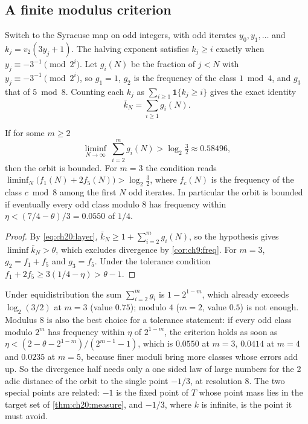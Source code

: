 \subsection{A finite modulus criterion}

Switch to the Syracuse map on odd integers, with odd iterates $y_0,y_1,\dots$ and $k_j=v_2(3y_j+1)$. The halving exponent satisfies $k_j\ge i$ exactly when $y_j\equiv-3^{-1}\pmod{2^i}$. Let $g_i(N)$ be the fraction of $j<N$ with $y_j\equiv-3^{-1}\pmod{2^i}$, so $g_1=1$, $g_2$ is the frequency of the class $1\bmod4$, and $g_3$ that of $5\bmod8$. Counting each $k_j$ as $\sum_{i\ge1}\mathbf 1\{k_j\ge i\}$ gives the exact identity
\begin{equation}\label{eq:ch20:layer}
\bar k_N=\sum_{i\ge1}g_i(N).
\end{equation}

\begin{proposition}\label{prop:ch20:mod8}
If for some $m\ge2$
\[
\liminf_{N\to\infty}\ \sum_{i=2}^{m}g_i(N)>\log_2\tfrac32\approx0.58496,
\]
then the orbit is bounded. For $m=3$ the condition reads $\liminf_N\bigl(f_1(N)+2f_5(N)\bigr)>\log_2\frac32$, where $f_c(N)$ is the frequency of the class $c\bmod8$ among the first $N$ odd iterates. In particular the orbit is bounded if eventually every odd class modulo $8$ has frequency within $\eta<(7/4-\theta)/3=0.0550$ of $1/4$.
\end{proposition}

\begin{proof}
By \eqref{eq:ch20:layer}, $\bar k_N\ge1+\sum_{i=2}^mg_i(N)$, so the hypothesis gives $\liminf\bar k_N>\theta$, which excludes divergence by \cref{cor:ch9:freq}. For $m=3$, $g_2=f_1+f_5$ and $g_3=f_5$. Under the tolerance condition $f_1+2f_5\ge3(1/4-\eta)>\theta-1$.
\end{proof}

Under equidistribution the sum $\sum_{i=2}^mg_i$ is $1-2^{1-m}$, which already exceeds $\log_2(3/2)$ at $m=3$ (value $0.75$); modulo $4$ ($m=2$, value $0.5$) is not enough. Modulus $8$ is also the best choice for a tolerance statement: if every odd class modulo $2^m$ has frequency within $\eta$ of $2^{1-m}$, the criterion holds as soon as $\eta<(2-\theta-2^{1-m})/(2^{m-1}-1)$, which is $0.0550$ at $m=3$, $0.0414$ at $m=4$ and $0.0235$ at $m=5$, because finer moduli bring more classes whose errors add up. So the divergence half needs only a one sided law of large numbers for the 2 adic distance of the orbit to the single point $-1/3$, at resolution $8$. The two special points are related: $-1$ is the fixed point of $T$ whose point mass lies in the target set of \cref{thm:ch20:measure}, and $-1/3$, where $k$ is infinite, is the point it must avoid.

